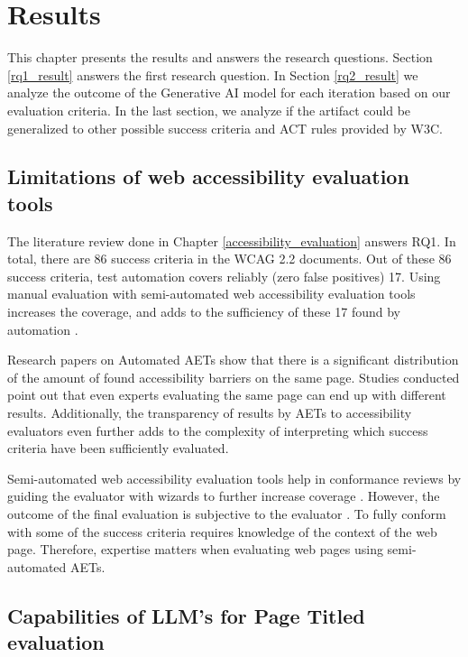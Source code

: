 \chapter{Results\label{results}}

This chapter presents the results and answers the research questions. Section \ref{rq1_result} answers the first research question. In Section \ref{rq2_result} we analyze the outcome of the Generative AI model for each iteration based on our evaluation criteria. In the last section, we analyze if the artifact could be generalized to other possible success criteria and ACT rules provided by W3C.

\section{Limitations of web accessibility evaluation tools\label{rq1_result}}

The literature review done in Chapter \ref{accessibility_evaluation} answers RQ1. In total, there are 86 success criteria in the WCAG 2.2 documents. Out of these 86 success criteria, test automation covers reliably (zero false positives) 17. Using manual evaluation with semi-automated web accessibility evaluation tools increases the coverage, and adds to the sufficiency of these 17 found by automation \citep{dequecoverage_semi}.

Research papers on Automated AETs show that there is a significant distribution of the amount of found accessibility barriers on the same page. Studies conducted point out that even experts evaluating the same page can end up with different results. Additionally, the transparency of results by AETs to accessibility evaluators even further adds to the complexity of interpreting which success criteria have been sufficiently evaluated.

Semi-automated web accessibility evaluation tools help in conformance reviews by guiding the evaluator with wizards to further increase coverage \citep{dequecoverage_semi}. However, the outcome of the final evaluation is subjective to the evaluator \cite{10.1145/1878803.1878813_testability_expertise}. To fully conform with some of the success criteria requires knowledge of the context of the web page. Therefore, expertise matters when evaluating web pages using semi-automated AETs.

\section{Capabilities of LLM's for Page Titled evaluation\label{rq2_result}}

